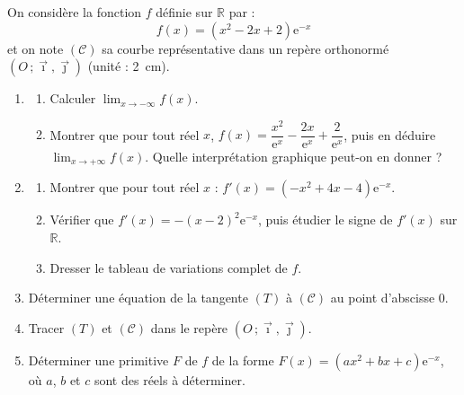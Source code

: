 \documentclass[11pt]{article}
\begin{document}
\begin{exercice}
On considère la fonction $f$ définie sur $\mathbb{R}$ par :
\[ f(x) = \left(x^{2} - 2x + 2\right)\mathrm{e}^{-x} \]
et on note $(\mathcal{C})$ sa courbe représentative dans un repère orthonormé $(O\,;\vec{\imath},\vec{\jmath})$ (unité : \SI{2}{cm}).
\begin{enumerate}
\item \begin{enumerate}
\item Calculer $\displaystyle\lim_{x \to -\infty} f(x)$.
\item Montrer que pour tout réel $x$, $f(x) = \dfrac{x^{2}}{\mathrm{e}^{x}} - \dfrac{2x}{\mathrm{e}^{x}} + \dfrac{2}{\mathrm{e}^{x}}$, puis en déduire $\displaystyle\lim_{x \to +\infty} f(x)$. Quelle interprétation graphique peut-on en donner ?
\end{enumerate}
\item \begin{enumerate}
\item Montrer que pour tout réel $x$ : $f'(x) = \left(-x^{2} + 4x - 4\right)\mathrm{e}^{-x}$.
\item Vérifier que $f'(x) = -(x-2)^{2}\mathrm{e}^{-x}$, puis étudier le signe de $f'(x)$ sur $\mathbb{R}$.
\item Dresser le tableau de variations complet de $f$.
\end{enumerate}
\item Déterminer une équation de la tangente $(T)$ à $(\mathcal{C})$ au point d'abscisse $0$.
\item Tracer $(T)$ et $(\mathcal{C})$ dans le repère $(O\,;\vec{\imath},\vec{\jmath})$.
\item Déterminer une primitive $F$ de $f$ de la forme $F(x) = (ax^{2}+bx+c)\mathrm{e}^{-x}$, où $a$, $b$ et $c$ sont des réels à déterminer.
\end{enumerate}
\end{exercice}
\end{document}
